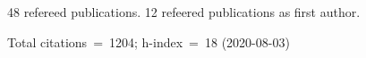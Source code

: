48 refereed publications. 12 refeered publications as first author.

Total citations~=~1204; h-index~=~18 (2020-08-03)